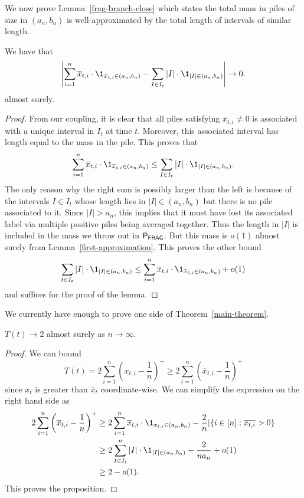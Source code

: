 \documentclass[12pt]{article}
\begin{document}
We now prove Lemma~\ref{frag-branch-close} which states the total mass in piles of size in $(a_n, b_n)$ is well-approximated by the total length of intervals of similar length. 
\begin{lem} \label{frag-branch-close}
	We have that
	\[
		\left | \sum_{i = 1}^n \overline{x}_{t, i} \cdot \1_{\overline{x}_{t, i} \in (a_n, b_n)} - \sum_{I \in I_t} |I| \cdot \1_{|I| \in (a_n, b_n)} \right | \to 0. 
	\]
	almost surely. 
\end{lem}	
\begin{proof}
	From our coupling, it is clear that all piles satisfying $\overline{x}_{t, i} \neq 0$ is associated with a unique interval in $I_t$ at time $t$. Moreover, this associated interval has length equal to the mass in the pile. This proves that 
	\[
		\sum_{i = 1}^n \overline{x}_{t, i} \cdot \1_{\overline{x}_{t, i} \in (a_n, b_n)} \leq \sum_{I \in I_t} |I| \cdot \1_{|I| \in (a_n, b_n)}.
	\] 
	The only reason why the right sum is possibly larger than the left is because of the intervals $I \in I_t$ whose length lies in $|I| \in (a_n, b_n)$ but there is no pile associated to it. Since $|I| > a_n$, this implies that it must have lost its associated label via multiple positive piles being averaged together. Thus the length in $|I|$ is included in the mass we throw out in $\mathsf{P}_{\mathsf{FRAG}}$. But this mass is $o(1)$ almost surely from Lemma~\ref{first-approximation}. This proves the other bound
	\[
		\sum_{t \in I_t} |I| \cdot \1_{|I| \in (a_n, b_n)} \leq \sum_{i = 1}^n \overline{x}_{t, i} \cdot \1_{\overline{x}_{t, i} \in (a_n, b_n)} + o(1) 
	\]
	and suffices for the proof of the lemma. 
\end{proof}

We currently have enough to prove one side of Theorem~\ref{main-theorem}.

\begin{prop}
	$T(t) \to 2$ almost surely as $n \to \infty$. 
\end{prop}
\begin{proof}
	We can bound
	\[
		T(t) = 2 \sum_{i = 1}^n \left ( x_{t, i} - \frac{1}{n} \right )^+ \geq 2 \sum_{i = 1}^n \left ( \overline{x}_{t, i} - \frac{1}{n} \right )^+
	\]
	since $x_t$ is greater than $\overline{x}_t$ coordinate-wise. We can simplify the expression on the right hand side as
	\begin{align*}
		2 \sum_{i = 1}^n \left ( \overline{x}_{t, i} - \frac{1}{n} \right )^+ & \geq 2 \sum_{i = 1}^n \overline{x}_{t, i} \cdot \1_{x_{t, i} \in (a_n, b_n)} - \frac{2}{n} | \{ i \in [n] : \overline{x_{t, i}} > 0\} \\
		& \geq 2 \sum_{I \in I_t}^n |I| \cdot \1_{|I| \in (a_n, b_n)} - \frac{2}{n a_n} + o(1) \\
		& \geq 2 - o(1).
	\end{align*}
	This proves the proposition. 
\end{proof}
\end{document}
